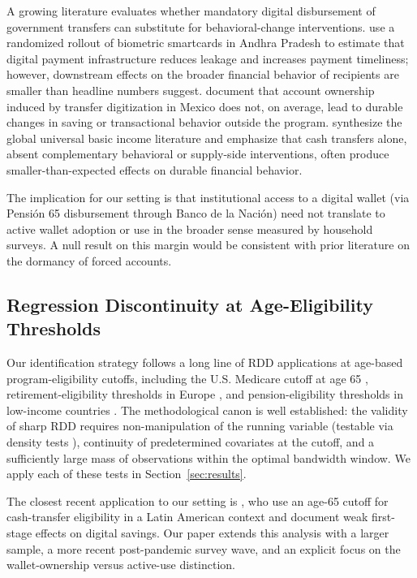\documentclass[12pt]{article}
\begin{document}
A growing literature evaluates whether mandatory digital disbursement of government transfers can substitute for behavioral-change interventions. \citet{muralidharan2016} use a randomized rollout of biometric smartcards in Andhra Pradesh to estimate that digital payment infrastructure reduces leakage and increases payment timeliness; however, downstream effects on the broader financial behavior of recipients are smaller than headline numbers suggest. \citet{bachas2018} document that account ownership induced by transfer digitization in Mexico does not, on average, lead to durable changes in saving or transactional behavior outside the program. \citet{banerjee2020} synthesize the global universal basic income literature and emphasize that cash transfers alone, absent complementary behavioral or supply-side interventions, often produce smaller-than-expected effects on durable financial behavior.

The implication for our setting is that institutional access to a digital wallet (via Pensi\'on 65 disbursement through Banco de la Naci\'on) need not translate to active wallet adoption or use in the broader sense measured by household surveys. A null result on this margin would be consistent with prior literature on the dormancy of forced accounts.

\subsection{Regression Discontinuity at Age-Eligibility Thresholds}

Our identification strategy follows a long line of RDD applications at age-based program-eligibility cutoffs, including the U.S. Medicare cutoff at age 65 \citep{card2008}, retirement-eligibility thresholds in Europe \citep{battistin2009}, and pension-eligibility thresholds in low-income countries \citep{ardington2016}. The methodological canon is well established: the validity of sharp RDD requires non-manipulation of the running variable (testable via density tests \citealp{cattaneo2018}), continuity of predetermined covariates at the cutoff, and a sufficiently large mass of observations within the optimal bandwidth window. We apply each of these tests in Section~\ref{sec:results}.

The closest recent application to our setting is \citet{aizenman2022}, who use an age-65 cutoff for cash-transfer eligibility in a Latin American context and document weak first-stage effects on digital savings. Our paper extends this analysis with a larger sample, a more recent post-pandemic survey wave, and an explicit focus on the wallet-ownership versus active-use distinction.
\end{document}
